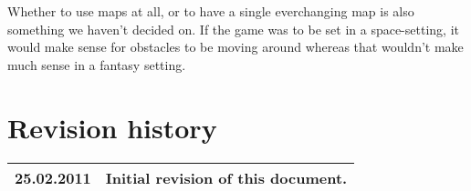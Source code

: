 \documentclass[titlepage,a4paper,11pt]{article}
\begin{document}
Whether to use maps at all, or to have a single everchanging map is also something
we haven't decided on. If the game was to be set in a space-setting, it would
make sense for obstacles to be moving around whereas that wouldn't make much sense
in a fantasy setting. 

\section{Revision history}

\begin{table}[H]
  \begin{tabular}{| c | c |}
    \hline
    25.02.2011 & Initial revision of this document. \\
    \hline
  \end{tabular}
\end{table}
\end{document}
